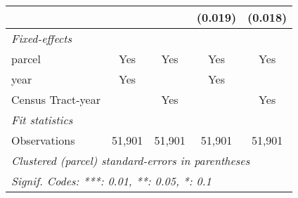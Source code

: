 \documentclass{article}
\begin{document}
\begin{table}[htbp]
{\begin{tabular}{lcccc}
                                 &               &                                     & (0.019)                   & (0.018)\\   
      \midrule
      \emph{Fixed-effects}\\
      parcel                     & Yes           & Yes                                 & Yes                       & Yes\\  
      year                       & Yes           &                                     & Yes                       & \\  
      Census Tract-year          &               & Yes                                 &                           & Yes\\  
      \midrule
      \emph{Fit statistics}\\
      Observations               & 51,901        & 51,901                              & 51,901                    & 51,901\\  
      \midrule \midrule
      \multicolumn{5}{l}{\emph{Clustered (parcel) standard-errors in parentheses}}\\
      \multicolumn{5}{l}{\emph{Signif. Codes: ***: 0.01, **: 0.05, *: 0.1}}\\
   \end{tabular}
   } %
\end{table}
\end{document}
